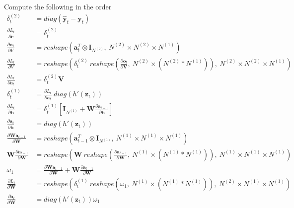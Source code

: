 \documentclass{article}
\newcommand{\diag}[1]{diag({#1})}
\newcommand{\reshape}[2]{reshape \left({#1},\ {#2}\right)}
\newcommand{\bm}[1]{\textbf{#1}}
\newcommand{\der}[2]{\frac{\partial #1}{\partial #2}}
\begin{document}
\begin{algorithm}
    \renewcommand{\thealgorithm}{}
    \begin{algorithmic}
        \State Compute the following in the order
        \begin{align*}
            \delta_t^{(2)} &= \diag{\hat{\bm{y}}_t - \bm{y}_t} \\
            \der{L_t}{\bm{c}} &= \delta_t^{(2)} \\
            \der{\bm{o}_t}{V} &= \reshape{\bm{a}_t^T\otimes \bm{I}_{N^{(2)}}}{N^{(2)}\times N^{(2)}\times N^{(1)}}\\
            \der{L_t}{V} &= \reshape{\delta_t^{(2)} \ \reshape{\der{\bm{o}_t}{\bm{V}}}{N^{(2)}\times\left(N^{(2)}*N^{(1)}\right)}}{N^{(2)}\times N^{(2)}\times N^{(1)}}\\
            \der{L_t}{\bm{a}_t} &= \delta_t^{(2)} \bm{V} \\
            \delta_t^{(1)} &= \der{L_t}{\bm{a}_t} \ \diag{h'(\bm{z}_t)} \\
            \der{L_t}{\bm{b}} &= \delta_t^{(1)} \left[\bm{I}_{N^{(1)}} + \bm{W} \der{\bm{a}_{t-1}}{\bm{b}}\right]\\
            \der{\bm{a}_t}{\bm{b}} &= \diag{h'(\bm{z}_t)} \\
            \der{\bm{W}\bm{a}_{t-1}}{\bm{W}} &= \reshape{\bm{a}_{t-1}^T \otimes \bm{I}_{N^{(1)}}}{N^{(1)}\times N^{(1)} \times N^{(1)}} \\
            \bm{W}\der{\bm{a}_{t-1}}{\bm{W}} &= \reshape{\bm{W} \ \reshape{\der{\bm{a}_{t-1}}{\bm{W}}}{N^{(1)}\times \left(N^{(1)}*N^{(1)}\right)}}{N^{(1)}\times N^{(1)}\times N^{(1)}} \\
            \omega_1 &= \der{\bm{W}\bm{a}_{t-1}}{\bm{W}}+\bm{W}\der{\bm{a}_{t-1}}{\bm{W}} \\
            \der{L_t}{\bm{W}} &= \reshape{\delta_t^{(1)} \ \reshape{\omega_1}{N^{(1)}\times \left(N^{(1)}*N^{(1)}\right)}}{N^{(2)}\times N^{(1)}\times N^{(1)}}\\
            \der{\bm{a}_t}{\bm{W}} &= \diag{h'\left(\bm{z}_t\right)} \omega_1 \\
        \end{align*}
        \EndFor
        \EndProcedure
    \end{algorithmic}
\end{algorithm}
\end{document}
